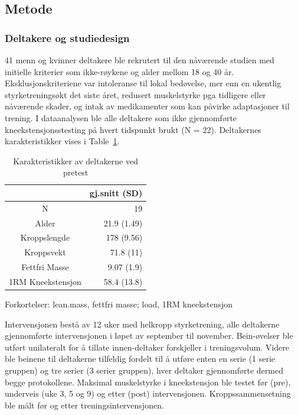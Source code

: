 \documentclass[
  letterpaper,
  DIV=11,
  numbers=noendperiod]{scrartcl}
\begin{document}
\hypertarget{metode}{%
\subsection{Metode}\label{metode}}

\hypertarget{deltakere-og-studiedesign}{%
\subsubsection{Deltakere og
studiedesign}\label{deltakere-og-studiedesign}}

41 menn og kvinner deltakere ble rekrutert til den nåværende studien med
initielle kriterier som ikke-røykene og alder mellom 18 og 40 år.
Eksklusjonskriteriene var intoleranse til lokal bedøvelse, mer enn en
ukentlig styrketreningsøkt det siste året, redusert muskelstyrke pga
tidligere eller nåværende skader, og intak av medikamenter som kan
påvirke adaptasjoner til trening. I dataanalysen ble alle deltakere som
ikke gjennomførte kneekstensjonsstesting på hvert tidspunkt brukt (N =
22). Deltakernes karakteristikker vises i Table~\ref{tbl-kar}.

\hypertarget{tbl-kar}{}
\setlength{\LTpost}{0mm}
\begin{longtable}{cr}
\caption{\label{tbl-kar}Karakteristikker av deltakerne ved pretest }\tabularnewline

\toprule
 & gj.snitt (SD) \\ 
\midrule
N & 19 \\ 
Alder & 21.9 (1.49) \\ 
Kroppslengde & 178 (9.56) \\ 
Kroppsvekt & 71.8 (11) \\ 
Fettfri Masse & 9.07 (1.9) \\ 
1RM Kneekstensjon & 58.4 (13.8) \\ 
\bottomrule
\end{longtable}
\begin{minipage}{\linewidth}
Forkortelser: lean.mass, fettfri masse; load, 1RM kneekstensjon\\
\end{minipage}

Intervensjonen bestå av 12 uker med helkropp styrketrening, alle
deltakerne gjennomførte intervensjonen i løpet av september til
november. Bein-øvelser ble utført unilateralt for å tillate
innen-deltaker forskjeller i treningsvolum. Videre ble beinene til
deltakerne tilfeldig fordelt til å utføre enten en serie (1 serie
gruppen) og tre serier (3 serier gruppen), hver deltaker gjennomførte
dermed begge protokollene. Maksimal muskelstyrke i kneekstensjon ble
testet før (pre), underveis (uke 3, 5 og 9) og etter (post)
intervensjonen. Kroppssammensetning ble målt før og etter
treningsintervensjonen.
\end{document}
